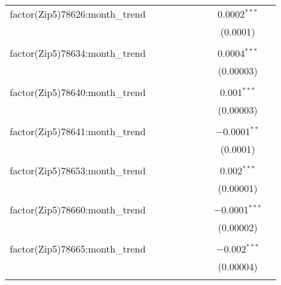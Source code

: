\begin{table}[H]
{\begin{tabular}{@{\extracolsep{5pt}}lcccccccc}
  factor(Zip5)78626:month\_trend &  &  &  &  &  &  & 0.0002$^{***}$ &  \\  

   &  &  &  &  &  &  & (0.0001) &  \\  

   & & & & & & & & \\  

  factor(Zip5)78634:month\_trend &  &  &  &  &  &  & 0.0004$^{***}$ &  \\  

   &  &  &  &  &  &  & (0.00003) &  \\  

   & & & & & & & & \\  

  factor(Zip5)78640:month\_trend &  &  &  &  &  &  & 0.001$^{***}$ &  \\  

   &  &  &  &  &  &  & (0.00003) &  \\  

   & & & & & & & & \\  

  factor(Zip5)78641:month\_trend &  &  &  &  &  &  & $-$0.0001$^{**}$ &  \\  

   &  &  &  &  &  &  & (0.0001) &  \\  

   & & & & & & & & \\  

  factor(Zip5)78653:month\_trend &  &  &  &  &  &  & 0.002$^{***}$ &  \\  

   &  &  &  &  &  &  & (0.00001) &  \\  

   & & & & & & & & \\  

  factor(Zip5)78660:month\_trend &  &  &  &  &  &  & $-$0.0001$^{***}$ &  \\  

   &  &  &  &  &  &  & (0.00002) &  \\  

   & & & & & & & & \\  

  factor(Zip5)78665:month\_trend &  &  &  &  &  &  & $-$0.002$^{***}$ &  \\  

   &  &  &  &  &  &  & (0.00004) &  \\  

   & & & & & & & & \\  


\end{tabular}}
\end{table}
